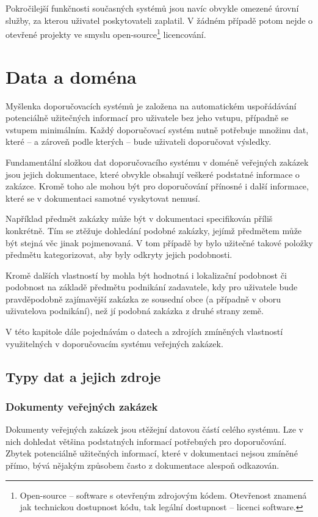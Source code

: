 \documentclass[thesis=M,czech]{FITthesis}[2019/12/23]
\begin{document}
Pokročilejší funkčnosti současných systémů jsou navíc obvykle omezené úrovní služby, za kterou uživatel poskytovateli zaplatil. V žádném případě potom nejde o otevřené projekty ve smyslu open-source\footnote{Open-source -- software s otevřeným zdrojovým kódem. Otevřenost znamená jak technickou dostupnost kódu, tak legální dostupnost – licenci software\cite{wikiOS}.} licencování.


\chapter{Data a doména}
Myšlenka doporučovacích systémů je založena na automatickém uspořádávání potenciálně užitečných informací pro uživatele bez jeho vstupu, případně se vstupem minimálním. Každý doporučovací systém nutně potřebuje množinu dat, které -- a zároveň podle kterých -- bude uživateli doporučovat výsledky.

Fundamentální složkou dat doporučovacího systému v doméně veřejných zakázek jsou jejich dokumentace, které obvykle obsahují veškeré podstatné informace o zakázce. Kromě toho ale mohou být pro doporučování přínosné i další informace, které se v dokumentaci samotné vyskytovat nemusí.

Například předmět zakázky může být v dokumentaci specifikován příliš konkrétně. Tím se ztěžuje dohledání podobné zakázky, jejímž předmětem může být stejná věc jinak pojmenovaná. V tom případě by bylo užitečné takové položky předmětu kategorizovat, aby byly odkryty jejich podobnosti.

Kromě dalších vlastností by mohla být hodnotná i lokalizační podobnost či podobnost na základě předmětu podnikání zadavatele, kdy pro uživatele bude pravděpodobně zajímavější zakázka ze sousední obce (a případně v oboru uživatelova podnikání), než jí podobná zakázka z druhé strany země.

V této kapitole dále pojednávám o datech a zdrojích zmíněných vlastností využitelných v doporučovacím systému veřejných zakázek.
\newpage

\section{Typy dat a jejich zdroje}
\subsection{Dokumenty veřejných zakázek}
\label{data&domain_dokumenty_vz}

Dokumenty veřejných zakázek jsou stěžejní datovou částí celého systému. Lze v nich dohledat většina podstatných informací potřebných pro doporučování. Zbytek potenciálně užitečných informací, které v dokumentaci nejsou zmíněné přímo, bývá nějakým způsobem často z dokumentace alespoň odkazován.
\end{document}
